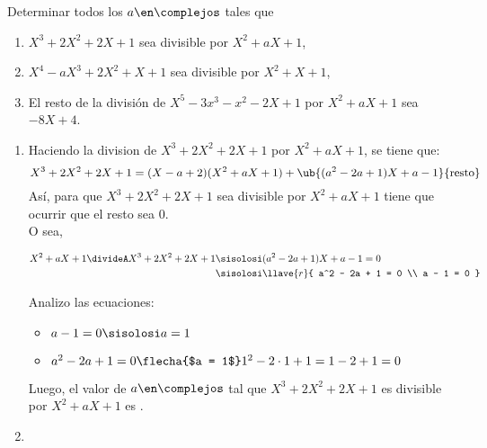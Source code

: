 \begin{enunciado}{\ejercicio}
  Determinar todos los $a \en \complejos$ tales que
  \begin{enumerate}[label=\roman*)]
    \item $X^3 + 2X^2 + 2X + 1$ sea divisible por $X^2 + aX + 1$,
    \item $X^4 - aX^3 + 2X^2 + X + 1$ sea divisible por $X^2 + X + 1$,
    \item El resto de la división de $X^5 - 3x^3 - x^2 - 2X + 1$ por $X^2 + aX + 1$ sea $-8X + 4$.
  \end{enumerate}
\end{enunciado}

\begin{enumerate}[label=\roman*)]
  \item
        Haciendo la division de $X^3 + 2X^2 + 2X + 1$ por $X^2 + aX + 1$, se tiene que:
        \[
          X^3 + 2X^2 + 2X + 1 = (X - a + 2)(X^2 + aX + 1) + \ub{(a^2 - 2a + 1)X + a - 1}{\text{resto}}
        \]
        Así, para que $X^3 + 2X^2 + 2X + 1$ sea divisible por $X^2 + aX + 1$ tiene que ocurrir que el resto sea 0.\\
        O sea,

        \begin{align*}
          X^2 + aX + 1 \divideA X^3 + 2X^2 + 2X + 1 \sisolosi & (a^2 - 2a + 1)X + a - 1 = 0 \\
          \sisolosi                                           & \llave{r}{
          a^2 - 2a + 1 = 0                                                                  \\
            a - 1 = 0
          }
        \end{align*}

        Analizo las ecuaciones:\\
        \begin{itemize}
          \item $a - 1 = 0 \sisolosi a = 1$
          \item $a^2 - 2a + 1 = 0
                  \flecha{$a = 1$}
                  1^2 - 2 \cdot 1 + 1 = 1 - 2 + 1 = 0$
        \end{itemize}

        Luego, el valor de $a \en \complejos$
        tal que $X^3 + 2X^2 + 2X + 1$ es divisible por $X^2 + aX + 1$ es .

  \item \hacer


\end{enumerate}
